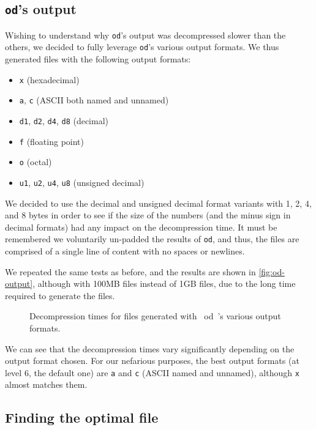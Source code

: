 \documentclass[a4paper,10pt,compsoc,conference]{IEEEtran}
\begin{document}
\subsection{\texttt{od}'s output}
\label{sec:org8fc9755}

Wishing to understand why \texttt{od}'s output was decompressed slower than the
others, we decided to fully leverage \texttt{od}'s various output formats. We thus
generated files with the following output formats:

\begin{itemize}
\item \texttt{x} (hexadecimal)
\item \texttt{a}, \texttt{c} (ASCII both named and unnamed)
\item \texttt{d1}, \texttt{d2}, \texttt{d4}, \texttt{d8} (decimal)
\item \texttt{f} (floating point)
\item \texttt{o} (octal)
\item \texttt{u1}, \texttt{u2}, \texttt{u4}, \texttt{u8} (unsigned decimal)
\end{itemize}

We decided to use the decimal and unsigned decimal format variants with 1, 2,
4, and 8 bytes in order to see if the size of the numbers (and the minus sign
in decimal formats) had any impact on the decompression time. It must be
remembered we voluntarily un-padded the results of \texttt{od}, and thus, the files
are comprised of a single line of content with no spaces or newlines.

We repeated the same tests as before, and the results are shown in
\autoref{fig:od-output}, although with 100MB files instead of 1GB files, due
to the long time required to generate the files.

\begin{figure}[h!]
  \begin{center}
    
  \end{center}
  \caption{Decompression times for files generated with ~od~'s various output formats.}
  \label{fig:od-output}
\end{figure}

We can see that the decompression times vary significantly depending on the
output format chosen. For our nefarious purposes, the best output formats (at
level 6, the default one) are \texttt{a} and \texttt{c} (ASCII named and unnamed), although
\texttt{x} almost matches them.

\subsection{Finding the optimal file}
\label{sec:orgb696b22}
\end{document}
